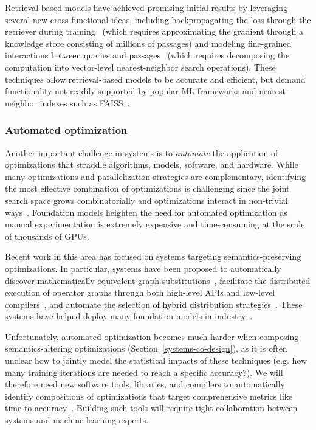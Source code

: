 Retrieval-based models have achieved promising initial results by leveraging several new cross-functional ideas, including backpropagating the loss through the retriever during training~\citep{guu2020realm} (which requires approximating the gradient through a knowledge store consisting of millions of passages) and modeling fine-grained interactions between queries and passages~\citep{khattab2020colbert,Khattab-etal:2020:OpenQA} (which requires decomposing the computation into vector-level nearest-neighbor search operations). These techniques allow retrieval-based models to be accurate and efficient, but demand functionality not readily supported by popular ML frameworks and nearest-neighbor indexes  such as FAISS~\citep{johnson2019billion}. 

\subsubsection{Automated optimization}

Another important challenge in systems is to \emph{automate} the application of optimizations that straddle algorithms, models, software, and hardware. While many optimizations and parallelization strategies are complementary, identifying the most effective combination of optimizations is challenging since the joint search space grows combinatorially and optimizations interact in non-trivial ways~\citep{narayanan2021efficient}. Foundation models heighten the need for automated optimization as manual experimentation is extremely expensive and time-consuming at the scale of thousands of GPUs.

Recent work in this area has focused on systems targeting semantics-preserving optimizations. In particular, systems have been proposed to automatically discover mathematically-equivalent graph substitutions~\citep{jia2019optimizing, wang2021pet}, facilitate the distributed execution of operator graphs through both high-level APIs and low-level compilers~\citep{rasley2020deepspeed, fairscale, jax2018github, shazeer2018mesh, lepikhin2020gshard}, and automate the selection of hybrid distribution strategies~\citep{jia2018beyond, santhanam2021distir}. These systems have helped deploy many foundation models in industry~\citep{fedus2021switch, m2m100, turingnlg}.

Unfortunately, automated optimization becomes much harder when composing semantics-altering optimizations (Section~\ref{systems-co-design}), as it is often unclear how to jointly model the statistical impacts  of these techniques (e.g. how many training iterations are needed to reach a specific accuracy?). We will therefore need new software tools, libraries, and compilers to automatically identify compositions of optimizations that target comprehensive metrics like time-to-accuracy~\citep{coleman2017dawnbench, mattson2020mlperf}. Building such tools will require tight collaboration between systems and machine learning experts.

